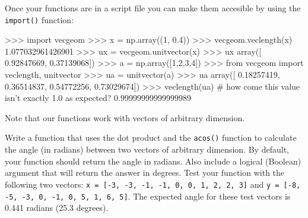 Once your functions are in a script file you can make them accesible by
using the \lstinline!import()! function:
%
\begin{python}
>>> import vecgeom
>>> x = np.array((1, 0.4))
>>> vecgeom.veclength(x)
1.077032961426901
>>> ux = vecgeom.unitvector(x)
>>> ux
array([ 0.92847669,  0.37139068])
>>> a = np.array([1,2,3,4])
>>> from vecgeom import veclength, unitvector
>>> ua = unitvector(a)
>>> ua
array([ 0.18257419,  0.36514837,  0.54772256,  0.73029674])
>>> veclength(ua)  # how come this value isn't exactly 1.0 as expected?
0.99999999999999989
\end{python}
Note that our functions work with vectors of arbitrary dimension.


\begin{assignment}
Write a function that uses the dot product and the \lstinline!acos()! function to calculate the angle (in radians) between two vectors of arbitrary dimension.  By default, your function should return the angle in radians. Also include a logical (Boolean) argument that will return the answer in degrees.  Test your function with the following two vectors: \lstinline!x = [-3, -3, -1, -1, 0, 0, 1, 2, 2, 3]! and
\lstinline!y = [-8, -5, -3, 0, -1, 0, 5, 1, 6, 5]!.  The expected angle for these test vectors is 0.441 radians (25.3 degrees).
\end{assignment}


